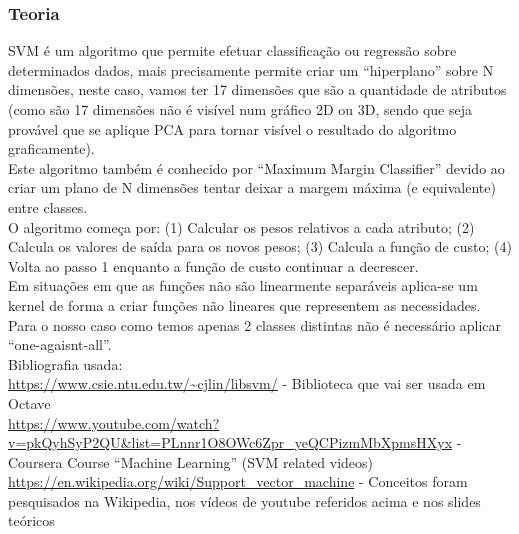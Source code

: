 \documentclass[portugues,final]{revdetua}
\begin{document}
\subsubsection{Teoria}
SVM é um algoritmo que permite efetuar classificação ou regressão sobre determinados dados, mais precisamente permite criar um “hiperplano” sobre N dimensões, neste caso, vamos ter 17 dimensões que são a quantidade de atributos (como são 17 dimensões não é visível num gráfico 2D ou 3D, sendo que seja provável que se aplique PCA para tornar visível o resultado do algoritmo graficamente).\\

Este algoritmo também é conhecido por “Maximum Margin Classifier” devido ao criar um plano de N dimensões tentar deixar a margem máxima (e equivalente) entre classes.\\

O algoritmo começa por: (1) Calcular os pesos relativos a cada atributo; (2) Calcula os valores de saída para os novos pesos; (3) Calcula a função de custo; (4) Volta ao passo 1 enquanto a função de custo continuar a decrescer.\\

Em situações em que as funções não são linearmente separáveis aplica-se um kernel de forma a criar funções não lineares que representem as necessidades.\\

Para o nosso caso como temos apenas 2 classes distintas não é necessário aplicar “one-agaisnt-all”.\\

Bibliografia usada:\\
\url{https://www.csie.ntu.edu.tw/~cjlin/libsvm/} - Biblioteca que vai ser usada em Octave\\
\url{https://www.youtube.com/watch?v=pkQyhSyP2QU&list=PLnnr1O8OWc6Zpr_yeQCPizmMbXpmsHXyx} - Coursera Course “Machine Learning” (SVM related videos)\\
\url{https://en.wikipedia.org/wiki/Support_vector_machine} - Conceitos foram pesquisados na Wikipedia, nos vídeos de youtube referidos acima e nos slides teóricos
\end{document}
